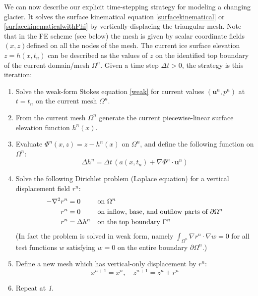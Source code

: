\documentclass[letterpaper,final,12pt,reqno]{amsart}
\newcommand{\grad}{\nabla}
\newcommand{\bu}{\mathbf{u}}
\begin{document}
We can now describe our explicit time-stepping strategy for modeling a changing glacier.  It solves the surface kinematical equation \eqref{surfacekinematical} or \eqref{surfacekinematicalwithPhi} by vertically-displacing the triangular mesh.  Note that in the FE scheme (see below) the mesh is given by scalar coordinate fields $(x,z)$defined on all the nodes of the mesh.  The current ice surface elevation $z=h(x,t_n)$ can be described as the values of $z$ on the identified top boundary of the current domain/mesh $\Omega^n$.  Given a time step $\Delta t > 0$, the strategy is this iteration:

\medskip
\renewcommand{\labelenumi}{\emph{\arabic{enumi}.}}
\begin{enumerate}
\item Solve the weak-form Stokes equation \eqref{weak} for current values $(\bu^n,p^n)$ at $t=t_n$ on the current mesh $\Omega^n$.
\item From the current mesh $\Omega^n$ generate the current piecewise-linear surface elevation function $h^n(x)$.
\item Evaluate $\Phi^n(x,z) = z - h^n(x)$ on $\Omega^n$, and define the following function on $\Omega^n$:
\begin{equation}
\Delta h^n =  \Delta t\,\left(a(x,t_n) + \grad \Phi^n\cdot \bu^n\right) \label{deltahfield}
\end{equation}
\item Solve the following Dirichlet problem (Laplace equation) for a vertical displacement field $r^n$:
\begin{align}
- \grad^2 r^n &= 0 & &\text{on } \Omega^n \label{vdisplacementpoisson} \\
          r^n &= 0 & &\text{on inflow, base, and outflow parts of } \partial \Omega^n \notag \\
          r^n &= \Delta h^n & &\text{on the top boundary } \Gamma^n \notag
\end{align}
(In fact the problem is solved in weak form, namely $\int_{\Omega^n} \grad r^n\cdot \grad w = 0$ for all test functions $w$ satisfying $w=0$ on the entire boundary $\partial \Omega^n$.)
\item Define a new mesh which has vertical-only displacement by $r^n$:
\begin{equation}
  x^{n+1} = x^n, \quad z^{n+1} = z^n + r^n \label{updatemesh}
\end{equation}
\item Repeat at \emph{1}.
\end{enumerate}
\end{document}
